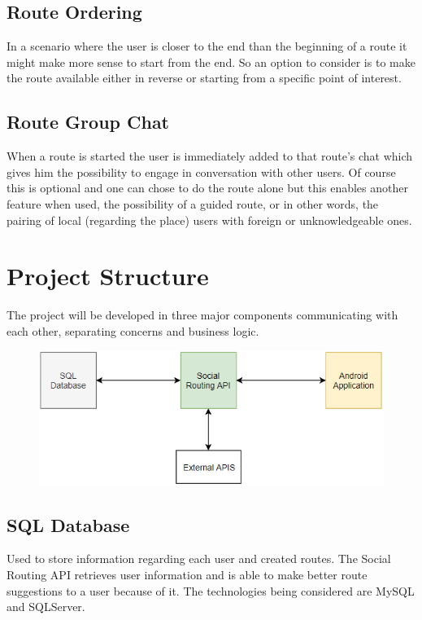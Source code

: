 \documentclass{article}
\begin{document}
        \subsection{Route Ordering}            
            In a scenario where the user is closer to the end than the beginning of a route it 
            might make more sense to start from the end. 
            So an option to consider is to make the route available either in reverse or starting from a specific point of interest.       

        \subsection{Route Group Chat}
            When a route is started the user is immediately added to that route's chat which gives him the possibility to engage in conversation with other users.
            Of course this is optional and one can chose to do the route alone but this enables another feature when used, the possibility of a guided route,
            or in other words, the pairing of local (regarding the place) users with foreign or unknowledgeable ones.
        

    \section{Project Structure}
        The project will be developed in three major components communicating with each other, separating concerns and business logic.
        
        \begin{figure}[h]
            \includegraphics[width=\textwidth]{images/dblocos.png}
        \end{figure} 

        \subsection{SQL Database}  
            Used to store information regarding each user and created routes. The Social Routing API retrieves user information and is able
            to make better route suggestions to a user because of it. The technologies being considered are MySQL and SQLServer.    
\end{document}
